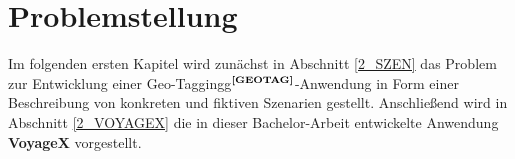 \section{Problemstellung}
Im folgenden ersten Kapitel wird zunächst in Abschnitt \ref{2_SZEN} das Problem zur Entwicklung einer Geo-Taggingg$^{\textbf{\ref{GEOTAG}}}$-Anwendung in Form einer Beschreibung von konkreten und fiktiven Szenarien gestellt. Anschließend wird in Abschnitt \ref{2_VOYAGEX} die in dieser Bachelor-Arbeit entwickelte Anwendung \textbf{VoyageX} vorgestellt.


